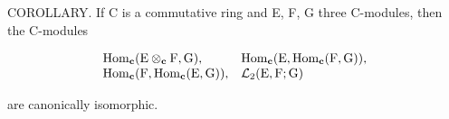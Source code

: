 COROLLARY. If C is a commutative ring and E, F, G three C-modules, then the C-modules

\[
\begin{array}{l l} \operatorname{Hom} _ {\mathbf {c}} (\mathrm{E} \otimes_ {\mathbf {c}} \mathrm{F}, \mathrm{G}), & \operatorname{Hom} _ {\mathbf {c}} (\mathrm{E}, \operatorname{Hom} _ {\mathbf {c}} (\mathrm{F}, \mathrm{G})), \\ \operatorname{Hom} _ {\mathbf {c}} (\mathrm{F}, \operatorname{Hom} _ {\mathbf {c}} (\mathrm{E}, \mathrm{G})), & \mathcal {L} _ {2} (\mathrm{E}, \mathrm{F}; \mathrm{G}) \end{array}
\]

are canonically isomorphic.
